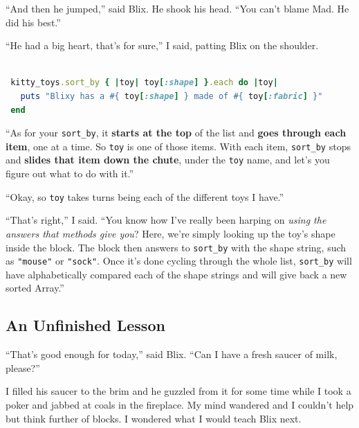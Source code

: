 \documentclass[10pt,twoside]{report}
\begin{document}
``And then he jumped,'' said Blix.  He shook his head.  ``You can't
blame Mad.  He did his best.''

``He had a big heart, that's for sure,'' I said, patting Blix on the
shoulder.


\begin{lstlisting}[basicstyle=\ttfamily\color{basiccolor},
    commentstyle = \ttfamily\color{commentcolor},
    keywordstyle=\ttfamily\color{keywordscolor},
    stringstyle=\color{stringcolor},
    language=Ruby,
    basicstyle=\small\ttfamily,
    showstringspaces=false,
  ]

 kitty_toys.sort_by { |toy| toy[:shape] }.each do |toy|
   puts "Blixy has a #{ toy[:shape] } made of #{ toy[:fabric] }"
 end

\end{lstlisting}

``As for your \lstinline[breaklines=true]|sort_by|, it {\bf starts at
  the top} of the list and {\bf goes through each item}, one at a
time. So \lstinline[breaklines=true]|toy| is one of those items.  With
each item, \lstinline[breaklines=true]|sort_by| stops and {\bf slides
  that item down the chute}, under the
\lstinline[breaklines=true]|toy| name, and let's you figure out what
to do with it.''

``Okay, so \lstinline[breaklines=true]|toy| takes turns being each of
the different toys I have.''

``That's right,'' I said.  ``You know how I've really been harping on
{\em using the answers that methods give you}?  Here, we're simply
looking up the toy's shape inside the block.  The block then answers
to \lstinline[breaklines=true]|sort_by| with the shape string, such as
\lstinline[breaklines=true]|"mouse"| or
\lstinline[breaklines=true]|"sock"|.  Once it's done cycling through
the whole list, \lstinline[breaklines=true]|sort_by| will have
alphabetically compared each of the shape strings and will give back a
new sorted Array.''



\subsection{ An Unfinished Lesson}



``That's good enough for today,'' said Blix.  ``Can I have a fresh
saucer of milk, please?''

I filled his saucer to the brim and he guzzled from it for some time
while I took a poker and jabbed at coals in the fireplace.  My mind
wandered and I couldn't help but think further of blocks.  I wondered
what I would teach Blix next.
\end{document}
